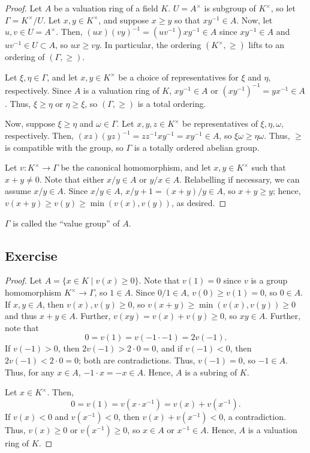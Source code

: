 \begin{proof}
Let $A$ be a valuation ring of a field $K$. $U = A^{\times}$ is subgroup of $K^{\times}$, so let $\Gamma = K^{\times}/U$. Let $x,y \in K^{\times}$,
and suppose $x \ge y$ so that $xy^{-1} \in A$. Now, let $u,v \in U = A^{\times}$. Then, $(ux)(vy)^{-1} = (uv^{-1})xy^{-1} \in A$ since $xy^{-1} \in A$
and $uv^{-1} \in U \subset A$, so $ux \ge vy$. In particular, the ordering $(K^{\times},\ge)$ lifts to an ordering of $(\Gamma, \ge)$.

Let $\xi,\eta \in \Gamma$, and let $x,y \in K^{\times}$ be a choice of representatives for $\xi$ and $\eta$, respectively. Since $A$ is a valuation ring 
of $K$, $xy^{-1} \in A$ or $(xy^{-1})^{-1} = yx^{-1} \in A$. Thus, $\xi \ge \eta$ or $\eta \ge \xi$, so $(\Gamma,\ge)$ is a total ordering.

Now, suppose $\xi \ge \eta$ and $\omega \in \Gamma$. Let $x,y,z \in K^{\times}$ be representatives of $\xi,\eta,\omega$, respectively. Then,
$(xz)(yz)^{-1} = zz^{-1}xy^{-1} = xy^{-1} \in A$, so $\xi \omega \ge \eta \omega$. Thus, $\ge$ is compatible with the group, so $\Gamma$ is
a totally ordered abelian group.

Let $v : K^{\times} \to \Gamma$ be the canonical homomorphism, and let $x,y \in K^{\times}$ such that $x + y \neq 0$. Note that either $x/y \in A$ or
$y/x \in A$. Relabelling if necessary, we can assume $x/y \in A$. Since $x/y \in A$, $x/y + 1 = (x + y)/y \in A$, so $x + y \ge y$; hence,
$v(x+y) \ge v(y) \ge \min(v(x),v(y))$, as desired.
\end{proof}

\begin{remark}
$\Gamma$ is called the ``value group'' of $A$.
\end{remark}

\subsection{Exercise}\label{5.31}

\begin{proof}
Let $A = \{x \in K \mid v(x) \ge 0\}$. Note that $v(1) = 0$ since $v$ is a group homomorphism $K^{\times} \to \Gamma$, so $1 \in A$. Since 
$0/1 \in A$, $v(0) \ge v(1) = 0$, so $0 \in A$. If $x,y \in A$, then $v(x),v(y) \ge 0$, so $v(x + y) \ge \min(v(x),v(y)) \ge 0$ and thus
$x + y \in A$. Further, $v(xy) = v(x) + v(y) \ge 0$, so $xy \in A$. Further, note that 
$$0 = v(1) = v(-1 \cdot -1) = 2 v(-1).$$
If $v(-1) > 0$, then $2 v(-1) > 2 \cdot 0 = 0$, and if $v(-1) < 0$, then $2 v(-1) < 2 \cdot 0 = 0$; both are contradictions. Thus, $v(-1) = 0$,
so $-1 \in A$. Thus, for any $x \in A$, $-1 \cdot x = -x \in A$. Hence, $A$ is a subring of $K$.

Let $x \in K^{\times}$. Then, 
$$0 = v(1) = v(x \cdot x^{-1}) = v(x) + v(x^{-1}).$$
If $v(x) < 0$ and $v(x^{-1}) < 0$, then $v(x) + v(x^{-1}) < 0$, a contradiction. Thus, $v(x) \ge 0$ or $v(x^{-1}) \ge 0$, so $x \in A$ or $x^{-1} \in A$.
Hence, $A$ is a valuation ring of $K$.
\end{proof}

